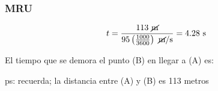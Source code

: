 \documentclass{beamer}
\begin{document}
\begin{frame}
\frametitle{MRU}
% 
{\large
\begin{equation} 
t=
\frac{113~\cancel{\text{m}}}{95 \left(\frac{1000}{3600}\right)~\cancel{\text{m}}/\text{s}}=
4.28~\text{s}
\end{equation}
}

                               
 
{\large
El tiempo que se demora el punto (B) en llegar a (A) 
es: 

ps: recuerda; la distancia entre (A) y (B) 
es 113 metros
}

\end{frame}

\end{document}
